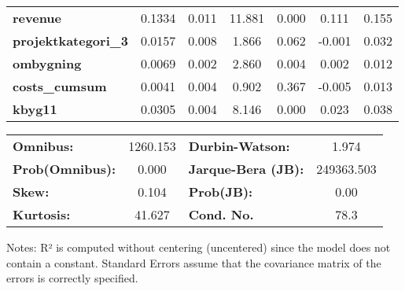 \begin{center}
\begin{tabular}{lcccccc}
\textbf{revenue}             &       0.1334  &        0.011     &    11.881  &         0.000        &        0.111    &        0.155     \\
\textbf{projektkategori\_3}  &       0.0157  &        0.008     &     1.866  &         0.062        &       -0.001    &        0.032     \\
\textbf{ombygning}           &       0.0069  &        0.002     &     2.860  &         0.004        &        0.002    &        0.012     \\
\textbf{costs\_cumsum}       &       0.0041  &        0.004     &     0.902  &         0.367        &       -0.005    &        0.013     \\
\textbf{kbyg11}              &       0.0305  &        0.004     &     8.146  &         0.000        &        0.023    &        0.038     \\
\bottomrule
\end{tabular}
\begin{tabular}{lclc}
\textbf{Omnibus:}       & 1260.153 & \textbf{  Durbin-Watson:     } &     1.974   \\
\textbf{Prob(Omnibus):} &   0.000  & \textbf{  Jarque-Bera (JB):  } & 249363.503  \\
\textbf{Skew:}          &   0.104  & \textbf{  Prob(JB):          } &      0.00   \\
\textbf{Kurtosis:}      &  41.627  & \textbf{  Cond. No.          } &      78.3   \\
\bottomrule
\end{tabular}
\end{center}

Notes: \newline
 [1] R² is computed without centering (uncentered) since the model does not contain a constant. \newline
 [2] Standard Errors assume that the covariance matrix of the errors is correctly specified.